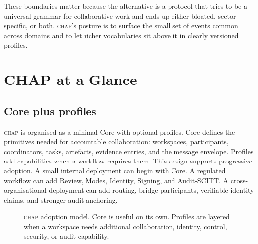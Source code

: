 \documentclass[11pt]{article}
\newcommand{\chap}{\textsc{chap}}
\begin{document}
These boundaries matter because the alternative is a protocol that tries to be a universal grammar for collaborative work and ends up either bloated, sector-specific, or both. \chap{}'s posture is to surface the small set of events common across domains and to let richer vocabularies sit above it in clearly versioned profiles.

\section{CHAP at a Glance}
\label{sec:chap-glance}

\subsection{Core plus profiles}

\chap{} is organised as a minimal Core with optional profiles. Core defines the primitives needed for accountable collaboration: workspaces, participants, coordinators, tasks, artefacts, evidence entries, and the message envelope. Profiles add capabilities when a workflow requires them. This design supports progressive adoption. A small internal deployment can begin with Core. A regulated workflow can add Review, Modes, Identity, Signing, and Audit-SCITT. A cross-organisational deployment can add routing, bridge participants, verifiable identity claims, and stronger audit anchoring.

\begin{figure}[!ht]
\centering
{}
\caption{\chap{} adoption model. Core is useful on its own. Profiles are layered when a workspace needs additional collaboration, identity, control, security, or audit capability.}
\label{fig:core-profiles}
\end{figure}
\end{document}
